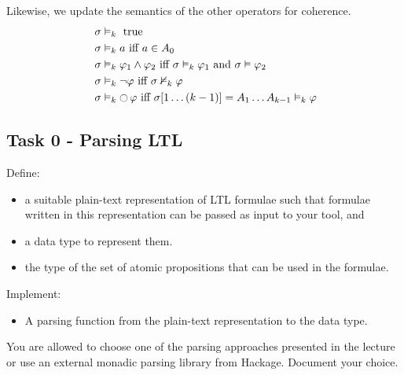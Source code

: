 \documentclass{article}
\begin{document}
Likewise, we update the semantics of the other operators for coherence.
\begin{align*}
    &\; \sigma \vDash_k \text{ true} \\
    &\; \sigma \vDash_k a \text{ iff } a \in A_0 \\
    &\; \sigma \vDash_k \varphi_1 \land \varphi_2 \text{ iff } \sigma \vDash_k \varphi_1 \text{ and } \sigma \vDash \varphi_2 \\
    &\; \sigma \vDash_k \neg \varphi \text{ iff } \sigma \nvDash_k \varphi \\
    &\; \sigma \vDash_k \mathop{\ocircle}{\varphi} \text{ iff } \sigma [1 \dots (k-1)] = A_1 \dots A_{k-1} \vDash_k \varphi \\
\end{align*}

\subsection*{Task 0 - Parsing LTL}
Define:
\begin{itemize}
    \item a suitable plain-text representation of LTL formulae such that formulae written in this representation can be passed as input to your tool, and
    \item a data type to represent them. 
    \item the type of the set of atomic propositions that can be used in the formulae.
\end{itemize}
Implement: 
\begin{itemize}
    \item A parsing function from the plain-text representation to the data type.
\end{itemize}

You are allowed to choose one of the parsing approaches presented in the lecture or 
use an external monadic parsing library from Hackage. Document your choice.
\end{document}
